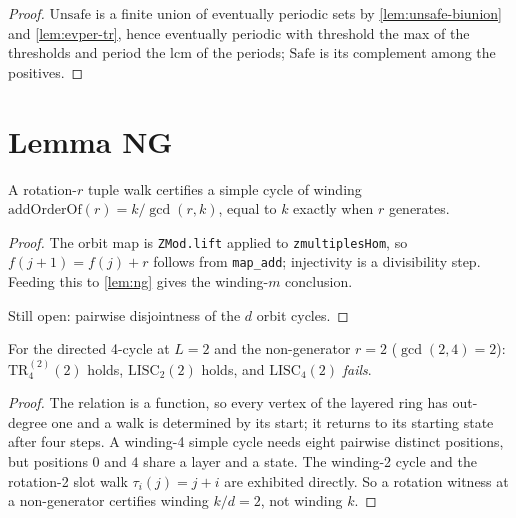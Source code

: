 \begin{proof}
\leanok
{}
$\mathrm{Unsafe}$ is a finite union of eventually periodic sets by
\ref{lem:unsafe-biunion} and \ref{lem:evper-tr}, hence eventually periodic with
threshold the max of the thresholds and period the lcm of the periods;
$\mathrm{Safe}$ is its complement among the positives.
\end{proof}

\section{Lemma NG}

\begin{lemma}
\label{lem:ng-orbit}
\leanok
{}
A rotation-$r$ tuple walk certifies a simple cycle of winding
$\mathrm{addOrderOf}(r) = k/\gcd(r,k)$, equal to $k$ exactly when $r$
generates.
\end{lemma}

\begin{proof}
\leanok
{}
The orbit map is \texttt{ZMod.lift} applied to \texttt{zmultiplesHom}, so
$f(j+1) = f(j) + r$ follows from \texttt{map\_add}; injectivity is a
divisibility step. Feeding this to \ref{lem:ng} gives the winding-$m$
conclusion.

Still open: pairwise disjointness of the $d$ orbit cycles.
\end{proof}

\begin{theorem}
\label{thm:ng-refute}
\leanok
{}
For the directed 4-cycle at $L = 2$ and the non-generator $r = 2$
($\gcd(2,4) = 2$): $\mathrm{TR}_4^{(2)}(2)$ holds, $\mathrm{LISC}_2(2)$ holds,
and $\mathrm{LISC}_4(2)$ \emph{fails}.
\end{theorem}

\begin{proof}
\leanok
{}
The relation is a function, so every vertex of the layered ring has out-degree
one and a walk is determined by its start; it returns to its starting state
after four steps. A winding-4 simple cycle needs eight pairwise distinct
positions, but positions $0$ and $4$ share a layer and a state. The winding-2
cycle and the rotation-2 slot walk $\tau_i(j) = j + i$ are exhibited directly.
So a rotation witness at a non-generator certifies winding $k/d = 2$, not
winding $k$.
\end{proof}
